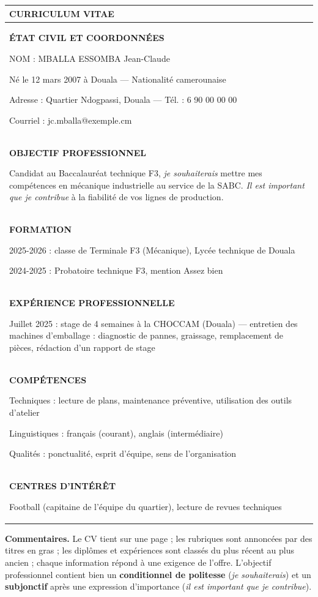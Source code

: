 \documentclass[11pt]{article}
\begin{document}
\begin{exoresolu}
\begin{center}
\begin{tabularx}{\linewidth}{|X|}
\hline
\rowcolor{popblueL} \textbf{CURRICULUM VITAE} \\
\hline
\textbf{ÉTAT CIVIL ET COORDONNÉES} \par
NOM : MBALLA ESSOMBA Jean-Claude \par
Né le 12 mars 2007 à Douala — Nationalité camerounaise \par
Adresse : Quartier Ndogpassi, Douala — Tél. : 6 90 00 00 00 \par
Courriel : jc.mballa@exemple.cm \\
\hline
\textbf{OBJECTIF PROFESSIONNEL} \par
Candidat au Baccalauréat technique F3, \emph{je souhaiterais} mettre mes compétences en mécanique industrielle au service de la SABC. \emph{Il est important que je contribue} à la fiabilité de vos lignes de production. \\
\hline
\textbf{FORMATION} \par
2025-2026 : classe de Terminale F3 (Mécanique), Lycée technique de Douala \par
2024-2025 : Probatoire technique F3, mention Assez bien \\
\hline
\textbf{EXPÉRIENCE PROFESSIONNELLE} \par
Juillet 2025 : stage de 4 semaines à la CHOCCAM (Douala) — entretien des machines d'emballage : diagnostic de pannes, graissage, remplacement de pièces, rédaction d'un rapport de stage \\
\hline
\textbf{COMPÉTENCES} \par
Techniques : lecture de plans, maintenance préventive, utilisation des outils d'atelier \par
Linguistiques : français (courant), anglais (intermédiaire) \par
Qualités : ponctualité, esprit d'équipe, sens de l'organisation \\
\hline
\textbf{CENTRES D'INTÉRÊT} \par
Football (capitaine de l'équipe du quartier), lecture de revues techniques \\
\hline
\end{tabularx}
\end{center}

\textbf{Commentaires.} Le CV tient sur une page ; les rubriques sont annoncées par des titres en gras ; les diplômes et expériences sont classés du plus récent au plus ancien ; chaque information répond à une exigence de l'offre. L'objectif professionnel contient bien un \textbf{conditionnel de politesse} (\emph{je souhaiterais}) et un \textbf{subjonctif} après une expression d'importance (\emph{il est important que je contribue}).


\end{exoresolu}
\end{document}
